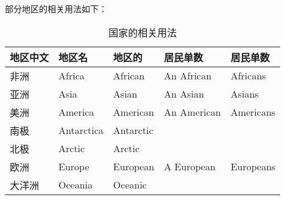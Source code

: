\documentclass[UTF8]{ctexart}
\begin{document}
    部分地区的相关用法如下：
    \begin{table}[h!]
        \begin{center}
            \ttfamily
            \begin{tabular}{p{65pt}|p{60pt}|p{85pt}|p{65pt}|p{60pt}}
                \hline
                地区中文&地区名&地区的&居民单数&居民单数\\ \hline
                非洲&Africa&African&An African&Africans\\ \hline
                亚洲&Asia&Asian&An Asian&Asians\\ \hline
                美洲&America&American&An American&Americans\\ \hline
                南极&Antarctica&Antarctic&&\\ \hline
                北极&Arctic&Arctic&&\\ \hline
                欧洲&Europe&European&A European&Europeans\\ \hline
                大洋洲&Oceania&Oceanic&&\\ \hline
            \end{tabular}
            \rmfamily
            \caption{国家的相关用法}
        \end{center}
    \end{table}\\

\newpage
\end{document}
